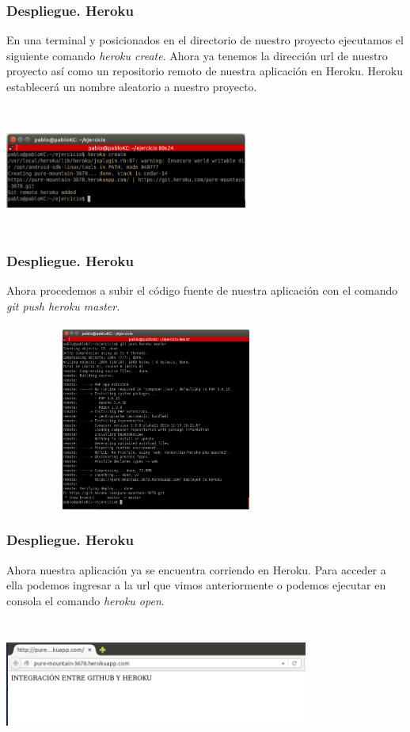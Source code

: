 \documentclass{beamer}
\begin{document}
\begin{frame}
\frametitle{Despliegue. Heroku}
En una terminal y posicionados en el directorio de nuestro proyecto ejecutamos el siguiente comando \textit{heroku create}. Ahora ya tenemos la dirección url de nuestro proyecto así como un repositorio remoto de nuestra aplicación en Heroku. Heroku establecerá un nombre aleatorio a nuestro proyecto.\\ \ \\
\centering
\includegraphics[width=8cm, height=4cm]{githubHeroku/14.png}
\end{frame}

\begin{frame}
\frametitle{Despliegue. Heroku}
Ahora procedemos a subir el código fuente de nuestra aplicación con el comando \textit{git push heroku master}.\\ \ \\
\centering
\includegraphics[width=10cm, height=6cm]{githubHeroku/19.png}
\end{frame}

\begin{frame}
\frametitle{Despliegue. Heroku}
Ahora nuestra aplicación ya se encuentra corriendo en Heroku. Para acceder a ella podemos ingresar a la url que vimos anteriormente o podemos ejecutar en consola el comando \textit{heroku open}.\\ \ \\
\centering
\includegraphics[width=10cm, height=4cm]{githubHeroku/27.png}
\end{frame}
\end{document}
